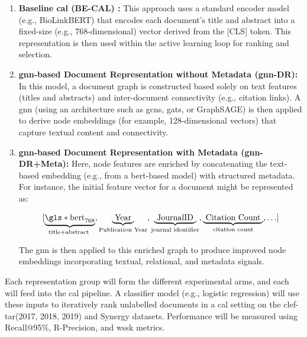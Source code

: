 \documentclass[10pt,oneside]{book}
\begin{document}
\begin{enumerate} \item \textbf{Baseline \gls*{cal} (BE-CAL) \cite{mao_reproducibility_2024}:}
This approach uses a standard encoder model (e.g., BioLinkBERT) that encodes each document’s title and abstract into a fixed-size (e.g., 768-dimensional) vector derived from the [CLS] token. This representation is then used within the active learning loop for ranking and selection.

\item \textbf{\gls*{gnn}-based Document Representation without Metadata (\gls*{gnn}-DR):}
In this model, a document graph is constructed based solely on text features (titles and abstracts) and inter-document connectivity (e.g., citation links). A \gls*{gnn} (using an architecture such as \glspl*{gcn}, \glspl*{gat}, or GraphSAGE) is then applied to derive node embeddings (for example, 128-dimensional vectors) that capture textual content and connectivity. 

\item \textbf{\gls*{gnn}-based Document Representation with Metadata (\gls*{gnn}-DR+Meta):}
Here, node features are enriched by concatenating the text-based embedding (e.g., from a \gls*{bert}-based model) with structured metadata. For instance, the initial feature vector for a document might be represented as:


\[
[\underbrace{\mathrm{\gls*{bert}}_{768}}_{\text {title+abstract }}, \underbrace{\text { Year }}_{\text{Publication Year}}, \underbrace{\text { JournalID }}_{\text{journal identifier}} , \underbrace{\text { Citation Count }}_{\text{citation count}} ,\ldots] 
\]

\vspace{0.5em}

The \gls*{gnn} is then applied to this enriched graph to produce improved node embeddings incorporating textual, relational, and metadata signals. \end{enumerate}

Each representation group will form the different experimental arms, and each will feed into the \gls*{cal} pipeline. A classifier model (e.g., logistic regression) will use these inputs to iteratively rank unlabelled documents in a \gls*{cal} setting on the \gls*{clef}-\gls*{tar}(2017, 2018, 2019) and Synergy datasets.  Performance will be measured using Recall@95\%, R-Precision, and \gls*{wssk} metrics.
\end{document}
